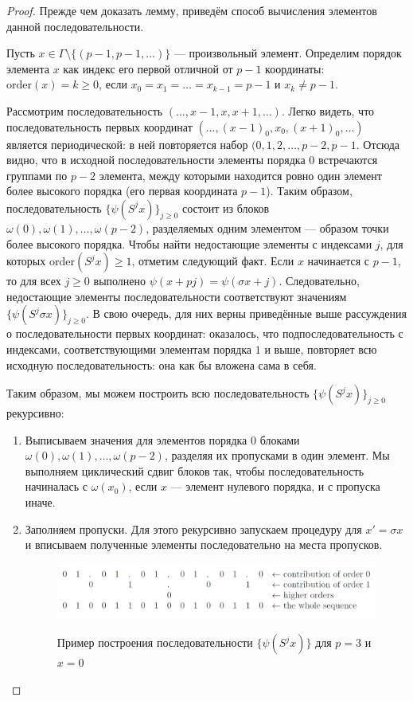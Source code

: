 \documentclass[14pt, a4paper, russian]{report}
\begin{document}
\begin{proof}
Прежде чем доказать лемму, приведём способ вычисления элементов данной последовательности.

Пусть $x \in \Gamma \setminus \{(p-1,p-1,\ldots)\}$ --- произвольный элемент. Определим порядок элемента $x$ как индекс его первой отличной от $p-1$ координаты: $\mathrm{order}(x) = k \ge 0$, если  $x_0=x_1=\ldots=x_{k-1}=p-1$ и $x_k \ne p-1$.

Рассмотрим последовательность $(\ldots, x-1,x,x+1, \ldots)$.  Легко видеть, что последовательность первых координат $(\ldots, (x-1)_0,x_0,(x+1)_0, \ldots)$ является периодической: в ней повторяется набор
$(0, 1, 2, \ldots,p-2, p-1$. Отсюда видно, что в исходной последовательности элементы порядка $0$ встречаются группами по $p-2$ элемента, между которыми находится ровно один элемент более высокого порядка (его первая координата $p-1$). Таким образом, последовательность
$\{\psi(S^j x)\}_{j \ge 0}$ состоит из блоков $\omega(0),\omega(1),\ldots, \omega(p-2)$, разделяемых одним элементом --- образом точки более высокого порядка. Чтобы найти недостающие элементы с индексами $j$, для которых $\mathrm{order}(S^j x) \ge 1$, отметим следующий факт. Если $x$ начинается с $p-1$, то для всех $j \ge 0$ выполнено $\psi(x+pj)=\psi(\sigma x + j)$. Следовательно, недостающие элементы последовательности соответствуют значениям $\{\psi(S^j \sigma x)\}_{j \ge 0}$. В свою очередь, для них верны приведённые выше рассуждения о последовательности первых координат: оказалось, что подпоследовательность с индексами, соответствующими элементам порядка $1$ и выше, повторяет всю исходную последовательность: она как бы вложена сама в себя.

Таким образом, мы можем построить всю последовательность $\{\psi(S^j x)\}_{j \ge 0}$ рекурсивно:
\begin{enumerate}
\item Выписываем значения для элементов порядка $0$ блоками $\omega(0),\omega(1),\ldots, \omega(p-2)$, разделяя их пропусками в один элемент. Мы выполняем циклический сдвиг блоков так, чтобы последовательность начиналась с $\omega(x_0)$, если $x$ --- элемент нулевого порядка, и с пропуска иначе.
\item Заполняем пропуски. Для этого рекурсивно запускаем процедуру для $x' = \sigma x$ и вписываем полученные элементы последовательно на места пропусков.

\begin{figure}[!h]
{\includegraphics[width=\linewidth]{recursion}}
    \caption{\footnotesize{Пример построения последовательности $\{\psi(S^j x)\}$ для  $p=3$ и $x=0$ \cite{weaklimits}}}
\label{fig:psi_construction}
\end{figure}


\end{enumerate}
\end{proof}
\end{document}

